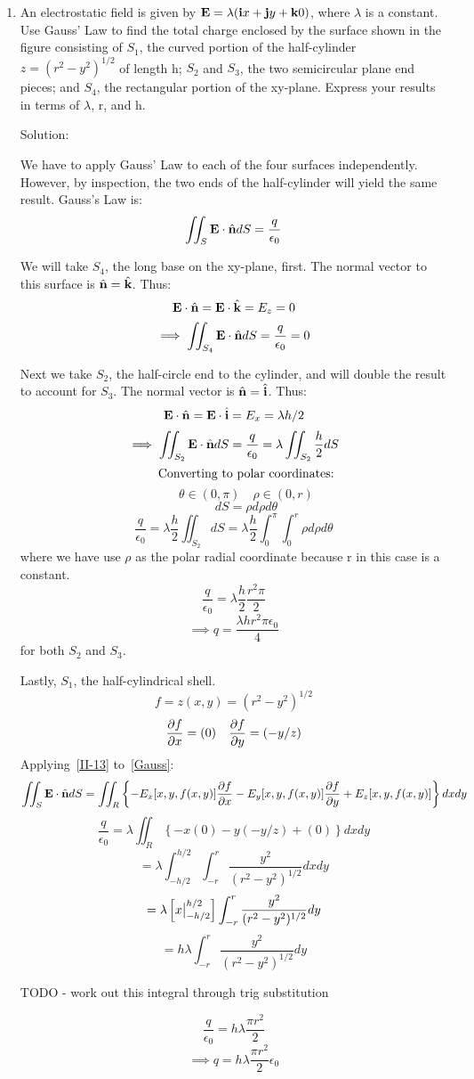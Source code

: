 \documentclass{article}
\begin{document}
\begin{enumerate}
    \item An electrostatic field is given by $\textbf{E} = \lambda (\textbf{i}{x} + \textbf{j}{y} + \textbf{k}{0})$, where $\lambda$ is a constant. Use Gauss' Law to find the total
    charge enclosed by the surface shown in the figure consisting of $S_1$, the curved portion of the half-cylinder $z = (r^2 - y^2)^{1/2}$ of length h;
    $S_2$ and $S_3$, the two semicircular plane end pieces; and $S_4$, the rectangular portion of the xy-plane. Express your results in terms of
    $\lambda$, r, and h.

    Solution:

    We have to apply Gauss' Law to each of the four surfaces independently. However, by inspection, the two ends of the half-cylinder will yield the same
    result. Gauss's Law is:
    \[ \iint_S \textbf{E} \cdot \hat{\textbf{n}} dS = \frac{q}{\epsilon_0} \]

    We will take $S_4$, the long base on the xy-plane, first. The normal vector to this surface is $\hat{\textbf{n}} = \hat{\textbf{k}}$. Thus:
    \[ \textbf{E} \cdot \hat{\textbf{n}} = \textbf{E} \cdot \hat{\textbf{k}} = E_z = 0 \]
    \[ \implies \iint_{S_4} \textbf{E} \cdot \hat{\textbf{n}} dS = \frac{q}{\epsilon_0} = 0 \]

    Next we take $S_2$, the half-circle end to the cylinder, and will double the result to account for $S_3$.
    The normal vector is $\hat{\textbf{n}} = \hat{\textbf{i}}$. Thus:
    \[ \textbf{E} \cdot \hat{\textbf{n}} = \textbf{E} \cdot \hat{\textbf{i}} = E_x = \lambda h/2 \]
    \[ \implies \iint_{S_2} \textbf{E} \cdot \hat{\textbf{n}} dS = \frac{q}{\epsilon_0} = \lambda \iint_{S_2} \frac{h}{2} dS \]
    \[ \qquad \textnormal{Converting to polar coordinates:} \]
    \[ \qquad \theta \in (0,\pi) \quad \rho \in (0,r) \]
    \[ \qquad dS = \rho d\rho d\theta \]
    \[ \frac{q}{\epsilon_0} = \lambda \frac{h}{2} \iint_{S_2} dS = \lambda \frac{h}{2} \int_0^\pi \int_0^r \rho d\rho d\theta \]
    where we have use $\rho$ as the polar radial coordinate because r in this case is a constant.
    \[ \frac{q}{\epsilon_0} = \lambda \frac{h}{2}\frac{r^2 \pi}{2} \]
    \[ \implies q = \frac{\lambda h r^2 \pi \epsilon_0}{4} \]
    for both $S_2$ and $S_3$.

    Lastly, $S_1$, the half-cylindrical shell.
    \[ f = z(x,y) = (r^2 - y^2)^{1/2} \]
    \[ \frac{\partial{f}}{\partial{x}} = (0) \quad \frac{\partial{f}}{\partial{y}} = (-y/z) \]
    Applying~\ref{II-13} to~\ref{Gauss}:
    \[ \iint_S \textbf{E} \cdot \hat{\textbf{n}} dS = \iint_R \left\{ -E_x[x,y,f(x,y)]\frac{\partial{f}}{\partial{x}} - E_y[x,y,f(x,y)]\frac{\partial{f}}{\partial{y}} + E_z[x,y,f(x,y)] \right\} dxdy \]
    \[ \frac{q}{\epsilon_0} = \lambda \iint_R \left\{ -x(0) - y(-y/z) + (0) \right\} dxdy \]
    \[ = \lambda \int_{-h/2}^{h/2} \int_{-r}^{r} \frac{y^2}{(r^2 - y^2)^{1/2}} dxdy \]
    \[ = \lambda \left[ x \big{|}_{-h/2}^{h/2} \right] \int_{-r}^{r} \frac{y^2}{(r^2 - y^2)^{1/2}} dy \]
    \[ = h \lambda \int_{-r}^{r} \frac{y^2}{(r^2 - y^2)^{1/2}} dy \]
    \centerline{TODO - work out this integral through trig substitution}
    \[ \frac{q}{\epsilon_0} = h \lambda \frac{\pi r^2}{2} \]
    \[ \implies q = h \lambda \frac{\pi r^2}{2} \epsilon_0 \]


\end{enumerate}
\end{document}
